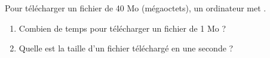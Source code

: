 \begin{exercice*}
   Pour télécharger un fichier de 40 Mo (mégaoctets), un ordinateur met .
   \begin{enumerate}
      \item Combien de temps pour télécharger un fichier de 1 Mo ?
      \item Quelle est la taille d'un fichier téléchargé en une seconde ?
   \end{enumerate}
\end{exercice*}

